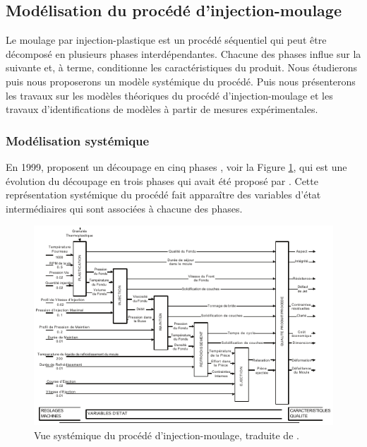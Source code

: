 \subsection{Modélisation du procédé d'injection-moulage}
Le moulage par injection-plastique est un procédé séquentiel qui peut être décomposé en plusieurs phases interdépendantes.
Chacune des phases influe sur la suivante et, à terme, conditionne les caractéristiques du produit.
Nous étudierons puis nous proposerons un modèle systémique du procédé.
Puis nous présenterons les travaux sur les modèles théoriques du procédé d'injection-moulage et les travaux d'identifications de modèles à partir de mesures expérimentales.

\subsubsection{Modélisation systémique} \label{subsubsec:molding_systemic}
En 1999, \citeauthor{kazmer_towards_1999} proposent un découpage en cinq phases \cite{kazmer_towards_1999}, voir la Figure \ref{fig:kazmer_systematic}, qui est une évolution du découpage en trois phases qui avait été proposé par \citeauthor{ma_design_1974} \cite{ma_design_1974}.
Cette représentation systémique du procédé fait apparaître des variables d’état intermédiaires qui sont associées à chacune des phases.

\begin{figure}[bthp]
	\centering
	\includegraphics[width=\textwidth,height=\textheight,keepaspectratio]{../Chap1/Figures/Kazmer_1999-Process.pdf}
	\caption{Vue systémique du procédé d'injection-moulage, traduite de \citeauthor{kazmer_towards_1999} \cite{kazmer_towards_1999}.}
	\label{fig:kazmer_systematic}
\end{figure}

